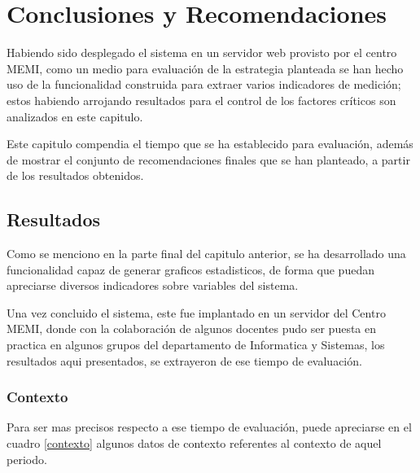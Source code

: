 \chapter{Conclusiones y Recomendaciones}

Habiendo sido desplegado el sistema en un servidor web provisto por el centro
MEMI, como un medio para evaluación de la estrategia planteada se han hecho uso
de la funcionalidad construida para extraer varios indicadores de medición;
estos habiendo arrojando resultados para el control de los factores críticos son
analizados en este capitulo.

Este capitulo compendia el tiempo que se ha establecido para evaluación, además
de mostrar el conjunto de recomendaciones finales que se han planteado, a partir
de los resultados obtenidos.

\section{Resultados}
Como se menciono en la parte final del capitulo anterior, se ha desarrollado una
funcionalidad capaz de generar graficos estadisticos, de forma que puedan
apreciarse diversos indicadores sobre variables del sistema.

Una vez concluido el sistema, este fue implantado en un servidor del Centro
MEMI, donde con la colaboración de algunos docentes pudo ser puesta en practica
en algunos grupos del departamento de Informatica y Sistemas, los resultados
aqui presentados, se extrayeron de ese tiempo de evaluación.

\subsection{Contexto}
Para ser mas precisos respecto a ese tiempo de evaluación, puede apreciarse en
el cuadro \ref{contexto} algunos datos de contexto referentes al contexto de
aquel periodo.

